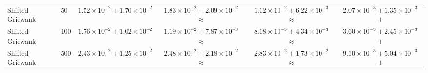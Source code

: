 \begin{table}[t]
\begin{tabular}{llcccc}
Shifted Griewank & 50 & $1.52\times10^{-2}\pm1.70\times10^{-2}$ & $1.83\times10^{-2}\pm2.09\times10^{-2}$ $\approx$ & $1.12\times10^{-2}\pm6.22\times10^{-3}$ $\approx$ & \textbf{$2.07\times10^{-3}\pm1.35\times10^{-3}$ $+$} \\
Shifted Griewank & 100 & $1.76\times10^{-2}\pm1.02\times10^{-2}$ & $1.19\times10^{-2}\pm7.87\times10^{-3}$ $\approx$ & $8.18\times10^{-3}\pm4.34\times10^{-3}$ $\approx$ & \textbf{$3.60\times10^{-3}\pm2.45\times10^{-3}$ $+$} \\
Shifted Griewank & 500 & $2.43\times10^{-2}\pm1.25\times10^{-2}$ & $2.48\times10^{-2}\pm2.18\times10^{-2}$ $\approx$ & $2.83\times10^{-2}\pm1.73\times10^{-2}$ $\approx$ & \textbf{$9.10\times10^{-3}\pm5.04\times10^{-3}$ $+$} \\
\bottomrule
\end{tabular}
\end{table}
